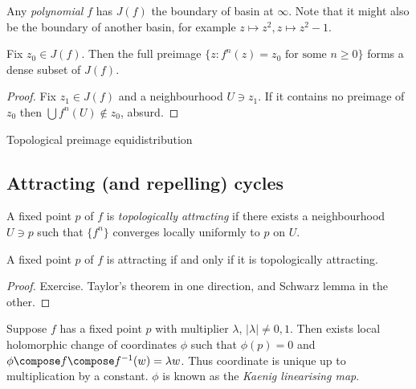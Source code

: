 \documentclass[a4paper]{article}
\begin{document}
\begin{eg}
  Any \emph{polynomial} \(f\) has \(J(f)\) the boundary of basin at \(\infty\). Note that it might also be the boundary of another basin, for example \(z \mapsto z^2, z \mapsto z^2 - 1\).
\end{eg}

\begin{corollary}
  Fix \(z_0 \in J(f)\). Then the full preimage \(\{z: f^n(z) = z_0 \text{ for some } n \geq 0\}\) forms a dense subset of \(J(f)\).
\end{corollary}

\begin{proof}
  Fix \(z_1 \in J(f)\) and a neighbourhood \(U \ni z_1\). If it contains no preimage of \(z_0\) then \(\bigcup f^n(U) \notin z_0\), absurd.
\end{proof}

Topological preimage equidistribution

\subsection{Attracting (and repelling) cycles}

\begin{definition}
  A fixed point \(p\) of \(f\) is \emph{topologically attracting} if there exists a neighbourhood \(U \ni p\) such that \(\{f^n\}\) converges locally uniformly to \(p\) on \(U\).
\end{definition}

\begin{lemma}
  A fixed point \(p\) of \(f\) is attracting if and only if it is topologically attracting.
\end{lemma}

\begin{proof}
  Exercise. Taylor's theorem in one direction, and Schwarz lemma in the other.
\end{proof}

\begin{theorem}
  Suppose \(f\) has a fixed point \(p\) with multiplier \(\lambda\), \(|\lambda| \ne 0, 1\). Then exists local holomorphic change of coordinates \(\phi\) such that \(\phi(p) = 0\) and \(\phi \compose f \compose f^{-1}(w) = \lambda w\). Thus coordinate is unique up to multiplication by a constant. \(\phi\) is known as the \emph{Kaenig linearising map}.
\end{theorem}
\end{document}
